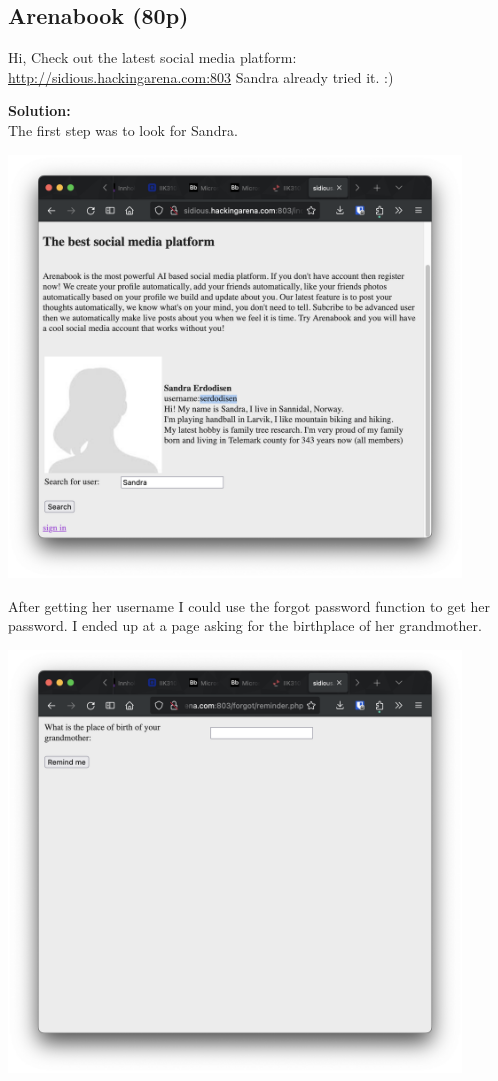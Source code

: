 \newpage
\subsection{Arenabook (80p)}
Hi, Check out the latest social media platform:
\url{http://sidious.hackingarena.com:803}
Sandra already tried it. :)

\textbf{Solution:}\\
The first step was to look for Sandra.

\begin{center}
    \includegraphics[width=12cm]{img/Web hacking/Arenabook/Skjermbilde 2023-10-26 kl. 14.49.43.png}
\end{center}

After getting her username I could use the forgot password function to get her password. I ended up at a page asking for the birthplace of her grandmother.

\begin{center}
    \includegraphics[width=12cm]{img/Web hacking/Arenabook/Skjermbilde 2023-10-26 kl. 14.50.02.png}
\end{center}

